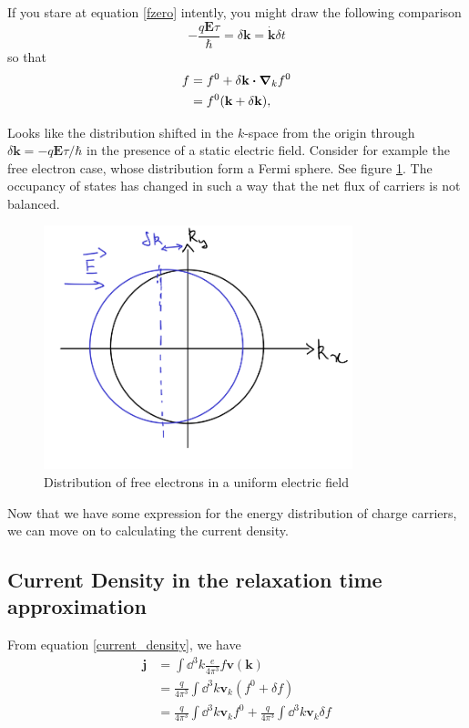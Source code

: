 \documentclass[a4paper]{article}
\newcommand{\hcut}{\hbar}
\begin{document}
If you stare at equation \ref{fzero} intently, you might draw the
following comparison
\begin{equation}
	-\frac{q\textbf{E}\tau}{\hcut} = \delta \mathbf{k} = \dot{\textbf{k}} \delta t
\end{equation}
so that
\begin{equation}
	\begin{split}
		f &= f^{0} + \delta \mathbf{k}\vdot\grad_kf^{0}\\
		  &= f^{0}(\textbf{k}+ \delta \mathbf{k}),
	\end{split}
\end{equation}

Looks like the distribution shifted in the $k$-space from the origin
through $\delta \mathbf{k} = -q \mathbf{E}\tau/\hcut$ in the presence
of a static electric field. Consider for example the free electron case,
whose distribution form a Fermi sphere. See figure \ref{fig:figures-shift-png}.
The occupancy of states has changed in such a way that the net flux
of carriers is not balanced.
\begin{figure}[h]
	\centering
	\includegraphics[width=0.8\textwidth]{figures/shift.png}
	\caption{Distribution of free electrons in a uniform electric field}
	\label{fig:figures-shift-png}
\end{figure}

Now that we have some expression for the energy distribution of
charge carriers, we can move on to calculating the current density.
\subsection*{Current Density in the relaxation time approximation}
From equation \ref{current_density}, we have
\begin{equation}
	\begin{split}
		\mathbf{j} &= \int \dd ^3 k \frac{e}{4\pi^3}f\textbf{v}(\textbf{k})\\
			   &= \frac{q}{4\pi^3}\int \dd ^3 k \mathbf{v}_k (f^{0} + \delta f) \\
			   &= \frac{q}{4\pi ^3}\int \dd ^3 k \mathbf{v}_k f^{0} + \frac{q}{4\pi ^3}\int \dd ^3 k \mathbf{v}_k \delta f
	\end{split}
\end{equation}
\end{document}

